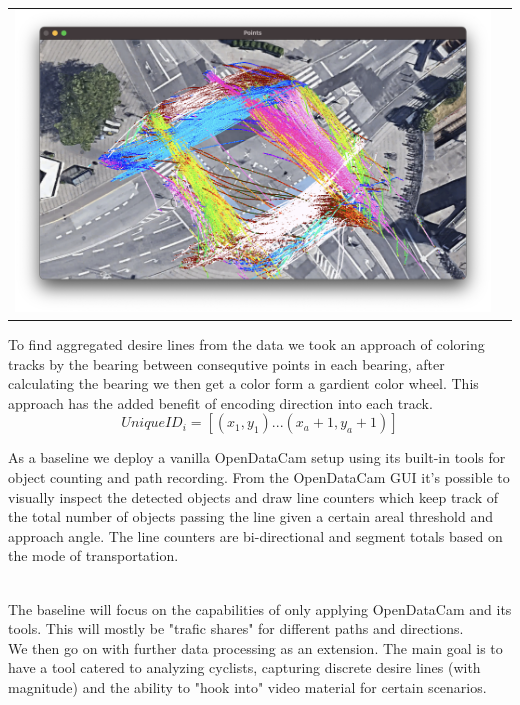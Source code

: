 \documentclass[
10pt, %
a4paper, %
oneside, %
headinclude,footinclude, %
] {book}%
\begin{document}
\ \\ 
\noindent
\begin{tabular}{@{}cc}
\includegraphics[width=1.0\columnwidth]{rainbow.png} 
\end{tabular}
\label{Rainbow}

To find aggregated desire lines from the data we took an approach of coloring tracks by the bearing between consequtive points in each 
bearing, after calculating the bearing we then get a color form a gardient color wheel. This approach has the added benefit of encoding direction into 
each track.
\ \\ 
\begin{equation}
  UniqueID_i = [(x_1, y_1)...(x_a+1, y_a+1)]\label{eq:3}
\end{equation}

As a baseline we deploy a vanilla OpenDataCam setup using its built-in tools for object counting and path recording.
From the OpenDataCam GUI it's possible to visually inspect the detected objects and draw line counters 
which keep track of the total number of objects passing the line given a certain areal threshold and approach angle. 
The line counters are bi-directional and segment totals based on the mode of transportation.

\ \\
The baseline will focus on the capabilities of only applying OpenDataCam and its tools. This will mostly be "trafic shares" for 
different paths and directions. 
\\ 
We then go on with further data processing as an extension. The main goal is to have a tool catered to analyzing cyclists, capturing
discrete desire lines (with magnitude) and the ability to "hook into" video material for certain scenarios.
\end{document}
